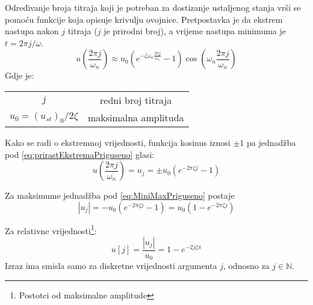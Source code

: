 Određivanje broja titraja koji je potreban za dostizanje ustaljenog stanja vrši
se pomoću funkcije koja opisuje krivulju ovojnice. Pretpostavka je da ekstrem
nastupa nakon $j$ titraja ($j$ je prirodni broj), a vrijeme nastupa minimuma je
$t=2\pi j/\omega$. 
\begin{equation}\label{eq:prirastEkstremaPriguseno}
    u\left(\frac{2\pi j}{\omega_n}\right) \approx
        u_0(e^{-\zeta\omega_n\frac{2\pi j}{\omega_n}}-1)\cos\left(\omega_n\frac{2\pi
        j}{\omega_n}\right)
\end{equation}
Gdje je:
\begin{table}[H]
    \begin{tabular}{c c}
        $j$ & redni broj titraja\\
        $u_0=(u_{st})_0/2\zeta$ & maksimalna amplituda\\
    \end{tabular}
\end{table}
Kako se radi o ekstremnoj vrijednosti, funkcija kosinus iznosi $\pm 1$ pa jednadžba
pod \eqref{eq:prirastEkstremaPriguseno} glasi:
\begin{equation}\label{eq:MiniMaxPriguseno}
     u\left(\frac{2\pi j}{\omega_n}\right) = u_j = 
        \pm u_0(e^{-2\pi\zeta j}-1)
\end{equation}

Za maksimume jednadžba pod \eqref{eq:MiniMaxPriguseno} postaje
\begin{equation}
    |u_j| = -u_0(e^{-2\pi\zeta j} -1) = u_0(1-e^{-2\pi\zeta j})
\end{equation}

Za relativne vrijednosti\footnote{Postotci od maksimalne amplitude}:
\begin{equation}
    u[j] = \frac{|u_j|}{u_0}=1-e^{-2j\zeta\pi}
\end{equation}
Izraz ima smisla samo za diskretne vrijednosti argumenta $j$, odnosno za $j \in
\mathbb{N}$.

